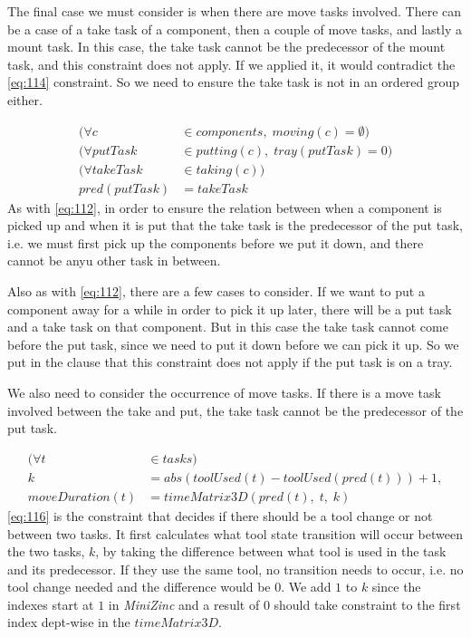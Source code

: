  The final case we must consider is when there are move tasks involved. There can be a case of a take task of a component, then a couple of move tasks, and lastly a mount task. In this case, the take task cannot be the predecessor of the mount task, and this constraint does not apply. If we applied it, it would contradict the \ref{eq:114} constraint. So we need to ensure the take task is not in an ordered group either.
 
 \begin{equation}
 \begin{aligned}\label{eq:113}
 (\forall c &\in components, \; moving(c) = \emptyset)\\
 (\forall putTask &\in putting(c), \; tray(putTask) = 0)\\
 (\forall takeTask &\in taking(c))\\
 pred(putTask) &= takeTask
 \end{aligned}
 \end{equation}
 As with \ref{eq:112}, in order to ensure the relation between when a component is picked up and when it is put that the take task is the predecessor of the put task, i.e. we must first pick up the components before we put it down, and there cannot be anyu other task in between.
 
 Also as with \ref{eq:112}, there are a few cases to consider. If we want to put a component away for a while in order to pick it up later, there will be a put task and a take task on that component. But in this case the take task cannot come before the put task, since we need to put it down before we can pick it up. So we put in the clause that this constraint does not apply if the put task is on a tray.
 
 We also need to consider the occurrence of move tasks. If there is a move task involved between the take and put, the take task cannot be the predecessor of the put task.
 
 \begin{equation}\label{eq:116}
 \begin{aligned}
 (\forall t &\in tasks) \\
 k &= abs(toolUsed(t) - toolUsed(pred(t))) + 1, \\
 moveDuration(t) &= timeMatrix3D(pred(t), \; t, \; k)
 \end{aligned}
 \end{equation}
\ref{eq:116} is the constraint that decides if there should be a tool change or not between two tasks. It first calculates what tool state transition will occur between the two tasks, $k$, by taking the difference between what tool is used in the task and its predecessor. If they use the same tool, no transition needs to occur, i.e. no tool change needed and the difference would be $0$. We add $1$ to $k$ since the indexes start at $1$ in \emph{MiniZinc} and a result of $0$ should take constraint to the first index dept-wise in the $timeMatrix3D$.
 

